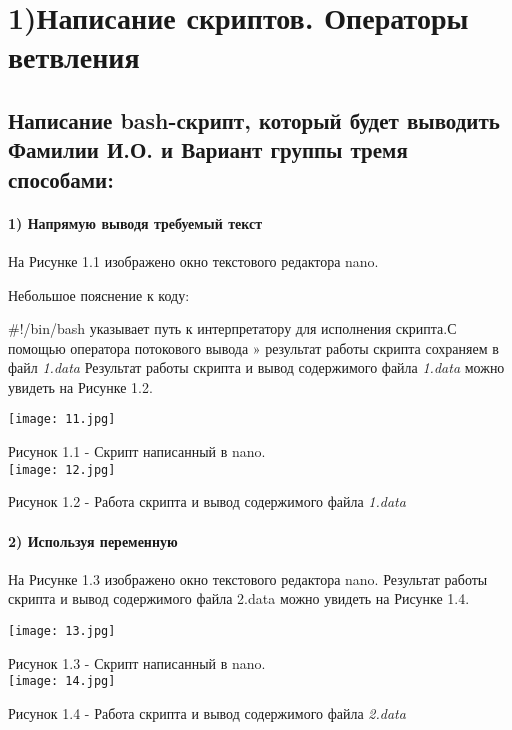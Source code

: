 \newpage
\section*{1)Написание скриптов. Операторы ветвления}

\subsection*{Написание bash-скрипт, который будет выводить Фамилии И.О. и Вариант группы тремя способами:
\\}

\paragraph{1) Напрямую выводя требуемый текст\\
}

На Рисунке 1.1 изображено окно текстового редактора nano.

Небольшое пояснение к коду:

\#!/bin/bash указывает путь к интерпретатору для исполнения скрипта.С помощью оператора потокового вывода » результат работы скрипта сохраняем в файл \textit{1.data} Результат работы скрипта и вывод содержимого файла \textit{1.data} можно увидеть на Рисунке 1.2.

\vspace{0.5cm}
		\begin{center}
			\texttt{[image: 11.jpg]}

			Рисунок 1.1 - Скрипт написанный в nano.\\

			\texttt{[image: 12.jpg]}

			Рисунок 1.2 - Работа скрипта и вывод содержимого файла \textit{1.data}\\

		\end{center}


\paragraph{2) Используя переменную
\\}

На Рисунке 1.3 изображено окно текстового редактора nano. Результат работы скрипта и вывод содержимого файла 2.data можно увидеть на Рисунке 1.4.

\vspace{0.5cm}
		\begin{center}
			\texttt{[image: 13.jpg]}

			Рисунок 1.3 - Скрипт написанный в nano.\\

			\texttt{[image: 14.jpg]}

			Рисунок 1.4 - Работа скрипта и вывод содержимого файла \textit{2.data}\\

		\end{center}


